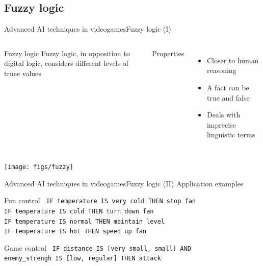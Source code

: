 \documentclass[10pt,compress]{beamer} %
\begin{document}
\subsection{Fuzzy logic}
\begin{frame}{Advanced AI techniques in videogames}{Fuzzy logic (I)}
    \begin{columns}
	   \vspace{-0.8cm}
		\begin{block}{Fuzzy logic}
		Fuzzy logic, in opposition to digital logic, considers different levels of truee values
		\end{block}
		Properties
		\begin{itemize}
		\item Closer to human reasoning
		\item A fact can be true and false
		\item Deals with imprecise linguistic terms
		\end{itemize}
	\end{columns}

		\centering\texttt{[image: figs/fuzzy]}\\
\end{frame}

\begin{frame}{Advanced AI techniques in videogames}{Fuzzy logic (II)}
	\centering Application examples
		\begin{block}{Fun control}
		\texttt{
IF temperature IS very cold THEN stop fan\\
IF temperature IS cold THEN turn down fan\\
IF temperature IS normal THEN maintain level\\
IF temperature IS hot THEN speed up fan\\
}
		\end{block}
		\begin{block}{Game control}
\texttt{
IF distance IS [very small, small] AND \\
	enemy\_strengh IS [low, regular] THEN attack		
	}
		\end{block}
\end{frame}


\end{document}
